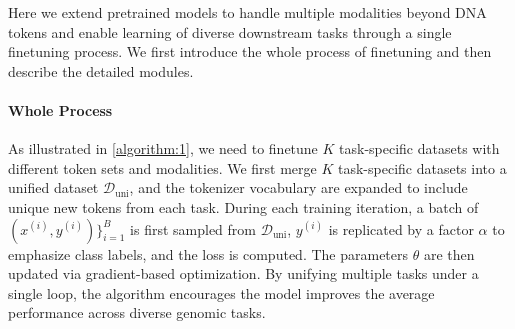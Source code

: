     




Here we extend pretrained models to handle multiple modalities beyond DNA tokens and enable learning of diverse downstream tasks through a single finetuning process. We first introduce the whole process of finetuning and then describe the detailed modules.  


\paragraph{Whole Process} As illustrated in \cref{algorithm:1}, we need to finetune $K$ task-specific datasets with different token sets and modalities. We first merge $K$ task-specific datasets into a unified dataset $\mathcal{D}_\text{uni}$, and the tokenizer vocabulary are expanded to include unique new tokens from each task. During each training iteration, a batch of $(x^{(i)}, y^{(i)})\}_{i=1}^B$ is first sampled from $\mathcal{D}_\text{uni}$, $y^{(i)}$ is replicated by a factor $\alpha$ to emphasize class labels, and the loss is computed. The parameters $\theta$ are then updated via gradient-based optimization. By unifying multiple tasks under a single loop, the algorithm encourages the model improves the average performance across diverse genomic tasks. %


